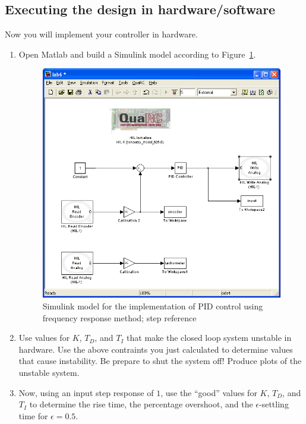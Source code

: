 \subsection{Executing the design in hardware/software}

Now you will implement your controller in hardware.
\begin{enumerate}
\item Open \textsf{Matlab} and build a \textsf{Simulink} model according to
Figure~\ref{fig:model9a}\@.
\begin{figure}[htbp]
\centering
\includegraphics[width=0.6\hsize]{pix/lab9a.jpg}
\caption{\textsf{Simulink} model for the implementation of PID control using
frequency response method; step reference}\label{fig:model9a}
\end{figure}%

\item Use values for $K$\@, $T_D$\@, and $T_I$ that make the closed loop
system unstable in hardware.  Use the above contraints you just calculated to
determine values that cause instability.  Be prepare to shut the system off!
Produce plots of the unstable system.

\item Now, using an input step response of $1$\@, use the ``good'' values for
$K$\@, $T_D$\@, and $T_I$ to determine the rise time, the percentage
overshoot, and the $\epsilon$-settling time for $\epsilon=0.5$\@.


\end{enumerate}
